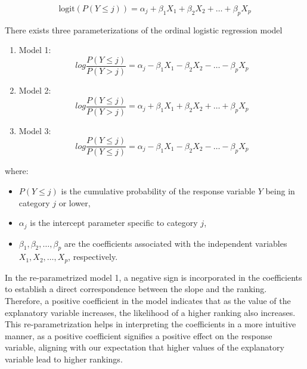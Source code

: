 \documentclass[12pt]{article}\usepackage[]{graphicx}\usepackage[]{xcolor}
\numberwithin{equation}{section}
\numberwithin{figure}{section}
\begin{document}
\begin{equation}
\text{logit}(P(Y \leq j)) = \alpha_j + \beta_1 X_1 + \beta_2 X_2 + \ldots + \beta_p X_p
\label{eq:3.1}
\end{equation}

\noindent There exists three parameterizations of the ordinal logistic regression model 
		\begin{enumerate}
		\item Model 1:\\
		\begin{equation}	
	log \frac{P(Y\le j)}{P(Y>j)} = \alpha_j - \beta_1 X_1 - \beta_2 X_2 - \ldots - \beta_p X_p
	\label{eq:3.2}
\end{equation}
		
			\item Model 2:\\
			\begin{equation}
			log \frac{P(Y\le j)}{P(Y>j)} = \alpha_j + \beta_1 X_1 + \beta_2 X_2 + \ldots + \beta_p X_p
		\label{eq:3.3}
\end{equation}
			
				\item Model 3:\\	
				\begin{equation}
				log \frac{P(Y\le j)}{P(Y\le j)}= \alpha_j - \beta_1 X_1 - \beta_2 X_2 - \ldots - \beta_p X_p
			\label{eq:3.4}
\end{equation}
				\end{enumerate}

	where:
	\begin{itemize}
		\item $P(Y \leq j)$ is the cumulative probability of the response variable $Y$ being in category $j$ or lower,
		\item $\alpha_j$ is the intercept parameter specific to category $j$,
		\item $\beta_1, \beta_2, \ldots, \beta_p$ are the coefficients associated with the independent variables $X_1, X_2, \ldots, X_p$, respectively.
	\end{itemize}
In the re-parametrized model 1, a negative sign is incorporated in the coefficients to establish a direct correspondence between the slope and the ranking. Therefore, a positive coefficient in the model indicates that as the value of the explanatory variable increases, the likelihood of a higher ranking also increases. This re-parametrization helps in interpreting the coefficients in a more intuitive manner, as a positive coefficient signifies a positive effect on the response variable, aligning with our expectation that higher values of the explanatory variable lead to higher rankings.
	
\end{document}
